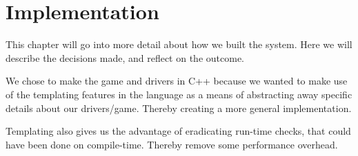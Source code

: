 \chapter{Implementation}\label{cha:implementation}

This chapter will go into more detail about how we built the system. Here we will describe the decisions made, and reflect on the outcome.

We chose to make the game and drivers in C++ because we wanted to make use of the templating features in the language as a means of abstracting away specific details about our drivers/game. Thereby creating a more general implementation. 

Templating also gives us the advantage of eradicating run-time checks, that could have been done on compile-time. Thereby remove some performance overhead.




